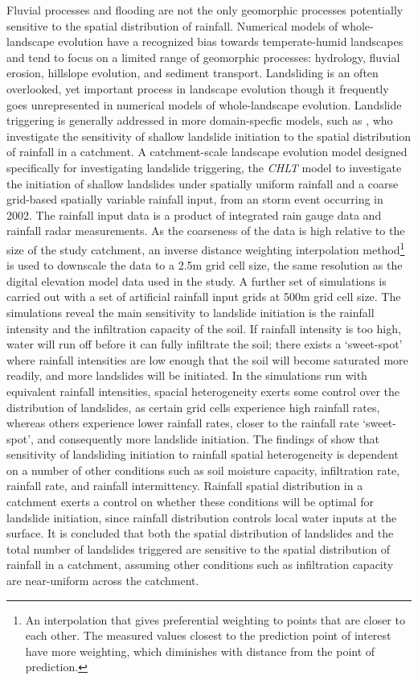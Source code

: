 Fluvial processes and flooding are not the only geomorphic processes potentially sensitive to the spatial distribution of rainfall. Numerical models of whole-landscape evolution have a recognized bias towards temperate-humid landscapes \citep{Pazzaglia2003,Tucker2010} and tend to focus on a limited range of geomorphic processes: hydrology, fluvial erosion, hillslope evolution, and sediment transport. Landsliding is an often overlooked, yet important process in landscape evolution though it frequently goes unrepresented in numerical models of whole-landscape evolution\citep{Tucker2010}. Landslide triggering is generally addressed in more domain-specfic models, such as \citet{von2014effects}, who investigate the sensitivity of shallow landslide initiation to the spatial distribution of rainfall in a catchment. A catchment-scale landscape evolution model designed specifically for investigating landslide triggering, the \emph{CHLT} model \citep{vonruette2013rainfall} to investigate the initiation of shallow landslides under spatially uniform rainfall and a coarse grid-based spatially variable rainfall input, from an storm event occurring in 2002. The rainfall input data is a product of integrated rain gauge data and rainfall radar measurements. As the coarseness of the data is high relative to the size of the study catchment, an inverse distance weighting interpolation method\footnote{An interpolation that gives preferential weighting to points that are closer to each other. The measured values closest to the prediction point of interest have more weighting, which diminishes with distance from the point of prediction.} is used to downscale the data to a 2.5m grid cell size, the same resolution as the digital elevation model data used in the study. A further set of simulations is carried out with a set of artificial rainfall input grids at 500m grid cell size. The simulations reveal the main sensitivity to landslide initiation is the rainfall intensity and the infiltration capacity of the soil. If rainfall intensity is too high, water will run off before it can fully infiltrate the soil; there exists a `sweet-spot' where rainfall intensities are low enough that the soil will become saturated more readily, and more landslides will be initiated. In the simulations run with equivalent rainfall intensities, spacial heterogeneity exerts some control over the distribution of landslides, as certain grid cells experience high rainfall rates, whereas others experience lower rainfall rates, closer to the rainfall rate `sweet-spot', and consequently more landslide initiation. The findings of \cite{vonruette2013rainfall} show that sensitivity of landsliding initiation to rainfall spatial heterogeneity is dependent on a number of other conditions such as soil moisture capacity, infiltration rate, rainfall rate, and rainfall intermittency. Rainfall spatial distribution in a catchment exerts a control on whether these conditions will be optimal for landslide initiation, since rainfall distribution controls local water inputs at the surface. It is concluded that both the spatial distribution of landslides and the total number of landslides triggered are sensitive to the spatial distribution of rainfall in a catchment, assuming other conditions such as infiltration capacity are near-uniform across the catchment.

